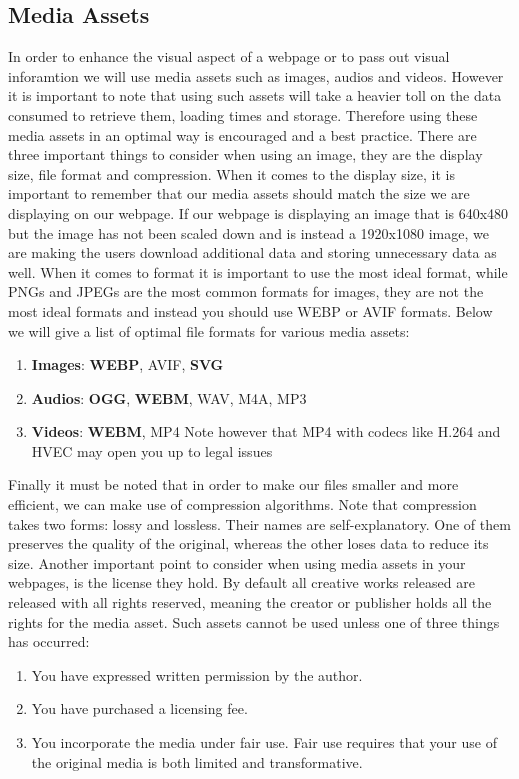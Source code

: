 \documentclass[11pt]{article}
\begin{document}
\subsection{Media Assets}
\label{sec:orgefa96d7}
In order to enhance the visual aspect of a webpage or to pass out visual inforamtion we will use
media assets such as images, audios and videos. However it is important to note that using such
assets will take a heavier toll on the data consumed to retrieve them, loading times and
storage. Therefore using these media assets in an optimal way is encouraged and a best
practice. There are three important things to consider when using an image, they are the display
size, file format and compression.
When it comes to the display size, it is important to remember
that our media assets should match the size we are displaying on our webpage. If our webpage is
displaying an image that is 640x480 but the image has not been scaled down and is instead a
1920x1080 image, we are making the users download additional data and storing unnecessary data as
well.
When it comes to format it is important to use the most ideal format, while PNGs and JPEGs
are the most common formats for images, they are not the most ideal formats and instead you should
use WEBP or AVIF formats. Below we will give a list of optimal file formats for various media
assets:
\begin{enumerate}
\item \textbf{Images}: \textbf{WEBP}, AVIF, \textbf{SVG}
\item \textbf{Audios}: \textbf{OGG}, \textbf{WEBM}, WAV, M4A, MP3
\item \textbf{Videos}: \textbf{WEBM}, MP4
Note however that MP4 with codecs like H.264 and HVEC may open you up to legal issues
\end{enumerate}
Finally it must be noted that in order to make our files smaller and more efficient, we can make use
of compression algorithms. Note that compression takes two forms: lossy and lossless. Their names
are self-explanatory. One of them preserves the quality of the original, whereas the other loses
data to reduce its size.
Another important point to consider when using media assets in your webpages, is the license they
hold. By default all creative works released are released with all rights reserved, meaning the
creator or publisher holds all the rights for the media asset. Such assets cannot be used unless one
of three things has occurred:
\begin{enumerate}
\item You have expressed written permission by the author.
\item You have purchased a licensing fee.
\item You incorporate the media under fair use.
Fair use requires that your use of the original media is both limited and transformative.
\end{enumerate}
\end{document}
